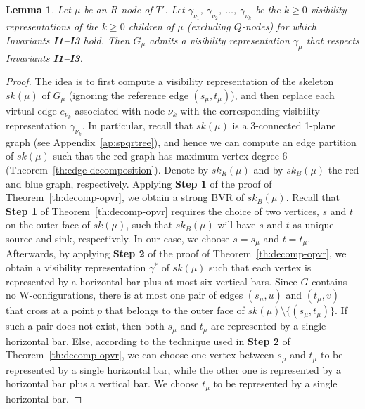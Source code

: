 \documentclass{article}
\newtheorem{lemma}{Lemma}
\begin{document}
\begin{lemma}\label{le:rnode}
Let $\mu$ be an $R$-node of $T'$. Let $\gamma_{\nu_1}$, $\gamma_{\nu_2}$, $\dots$, $\gamma_{\nu_k}$ be the $k \geq 0$ visibility representations of the $k \geq 0$ children of $\mu$ (excluding $Q$-nodes) for which Invariants {\bf I1--I3} hold. Then $G_\mu$ admits a visibility representation $\gamma_\mu$ that respects Invariants {\bf I1--I3}.
\end{lemma}
\begin{proof}
The idea is to first compute a visibility representation of the skeleton $sk(\mu)$ of $G_\mu$ (ignoring the reference edge $(s_\mu,t_\mu)$), and then replace each virtual edge $e_{\nu_k}$ associated with node ${\nu_k}$ with the corresponding visibility representation $\gamma_{\nu_k}$. In particular, recall that $sk(\mu)$ is a 3-connected 1-plane graph (see Appendix~\ref{ap:spqrtree}), and hence we can compute an edge partition of $sk(\mu)$ such that the red graph has maximum vertex degree $6$ (Theorem~\ref{th:edge-decomposition}). Denote by $sk_R(\mu)$ and by $sk_B(\mu)$ the red and blue graph, respectively. Applying {\bf Step 1} of the proof of Theorem~\ref{th:decomp-opvr}, we obtain a strong BVR of $sk_B(\mu)$.  Recall that {\bf Step 1} of Theorem~\ref{th:decomp-opvr} requires the choice of two vertices, $s$ and $t$ on the outer face of $sk(\mu)$, such that $sk_B(\mu)$ will have $s$ and $t$ as unique source and sink, respectively. In our case, we choose $s=s_\mu$ and $t=t_\mu$. Afterwards, by applying {\bf Step 2} of the proof of Theorem~\ref{th:decomp-opvr}, we obtain a visibility representation $\gamma^*$ of  $sk(\mu)$ such that each vertex is represented by a horizontal bar plus at most six vertical bars. Since $G$ contains no W-configurations, there is at most one pair of edges  $(s_\mu,u)$ and $(t_\mu,v)$ that cross at a point $p$ that belongs to the outer face of $sk(\mu) \setminus \{(s_\mu,t_\mu)\}$. If such a pair does not exist, then both $s_\mu$ and $t_\mu$ are represented by a single horizontal bar. Else, according to the technique used in {\bf Step 2} of Theorem~\ref{th:decomp-opvr},  we can choose one vertex between $s_\mu$ and $t_\mu$ to be represented by a single horizontal bar, while the other one is represented by a horizontal bar plus a vertical bar. We choose $t_\mu$ to be represented by a single horizontal bar.



\end{proof}
\end{document}
